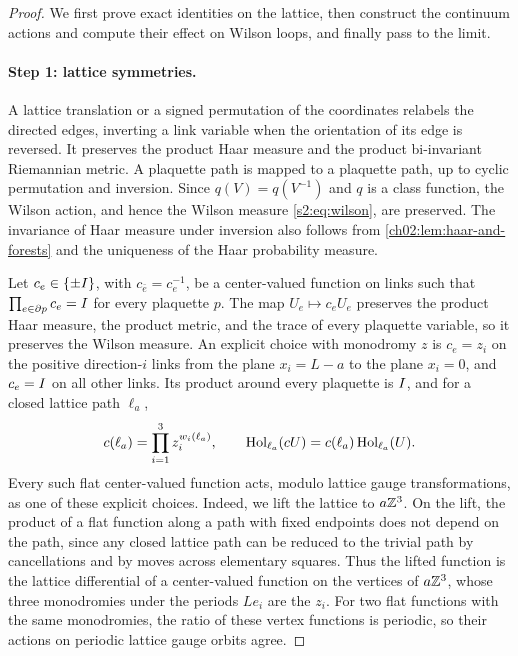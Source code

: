 \begin{proof}
We first prove exact identities on the lattice, then construct the continuum actions and compute their effect on Wilson loops, and finally pass to the limit.

\paragraph{Step 1: lattice symmetries.}
A lattice translation or a signed permutation of the coordinates relabels the directed edges, inverting a link variable when the orientation of its edge is reversed. It preserves the product Haar measure and the product bi-invariant Riemannian metric. A plaquette path is mapped to a plaquette path, up to cyclic permutation and inversion. Since $q(V)=q(V^{-1})$ and $q$ is a class function, the Wilson action, and hence the Wilson measure \eqref{s2:eq:wilson}, are preserved. The invariance of Haar measure under inversion also follows from \cref{ch02:lem:haar-and-forests} and the uniqueness of the Haar probability measure.

Let $c_e\in\{\pm I\}$, with $c_{\bar e}=c_e^{-1}$, be a center-valued function on links such that $\prod_{e\in\partial p}c_e=I$ for every plaquette $p$. The map $U_e\mapsto c_eU_e$ preserves the product Haar measure, the product metric, and the trace of every plaquette variable, so it preserves the Wilson measure. An explicit choice with monodromy $z$ is $c_e=z_i$ on the positive direction-$i$ links from the plane $x_i=L-a$ to the plane $x_i=0$, and $c_e=I$ on all other links. Its product around every plaquette is $I$, and for a closed lattice path $\ell_a$,
\begin{equation}\label{ch26:eq:center-word-sign}
 c(\ell_a)=\prod_{i=1}^3z_i^{w_i(\ell_a)},\qquad\operatorname{Hol}_{\ell_a}(cU)=c(\ell_a)\operatorname{Hol}_{\ell_a}(U).
\end{equation}
Every such flat center-valued function acts, modulo lattice gauge transformations, as one of these explicit choices. Indeed, we lift the lattice to $a\mathbb Z^3$. On the lift, the product of a flat function along a path with fixed endpoints does not depend on the path, since any closed lattice path can be reduced to the trivial path by cancellations and by moves across elementary squares. Thus the lifted function is the lattice differential of a center-valued function on the vertices of $a\mathbb Z^3$, whose three monodromies under the periods $Le_i$ are the $z_i$. For two flat functions with the same monodromies, the ratio of these vertex functions is periodic, so their actions on periodic lattice gauge orbits agree.


\end{proof}
